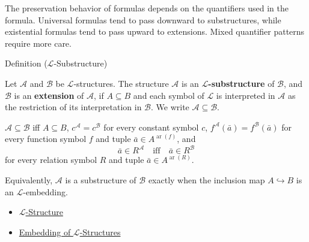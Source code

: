 
\begin{remark*}[Exposition]
The preservation behavior of formulas depends on the quantifiers used in the
formula. Universal formulas tend to pass downward to substructures, while
existential formulas tend to pass upward to extensions. Mixed quantifier
patterns require more care.
\end{remark*}

\begin{definitionbox}{Definition ($\mathcal{L}$-Substructure)}
\begin{definition}\label{def:l-substructure}
Let $\mathcal{A}$ and $\mathcal{B}$ be $\mathcal{L}$-structures.
The structure $\mathcal{A}$ is an \textbf{$\mathcal{L}$-substructure} of
$\mathcal{B}$, and $\mathcal{B}$ is an \textbf{extension} of $\mathcal{A}$, if
$A\subseteq B$ and each symbol of $\mathcal{L}$ is interpreted in
$\mathcal{A}$ as the restriction of its interpretation in $\mathcal{B}$.
We write $\mathcal{A}\subseteq\mathcal{B}$.
\end{definition}
\end{definitionbox}

\begin{remark*}
$\mathcal{A}\subseteq\mathcal{B}$ iff $A\subseteq B$,
$c^{\mathcal{A}}=c^{\mathcal{B}}$ for every constant symbol $c$,
$f^{\mathcal{A}}(\bar a)=f^{\mathcal{B}}(\bar a)$ for every function symbol
$f$ and tuple $\bar a\in A^{\operatorname{ar}(f)}$, and
\[
  \bar a\in R^{\mathcal{A}}
  \quad\text{iff}\quad
  \bar a\in R^{\mathcal{B}}
\]
for every relation symbol $R$ and tuple
$\bar a\in A^{\operatorname{ar}(R)}$.
\end{remark*}

\begin{remark*}[Interpretation]
Equivalently, $\mathcal{A}$ is a substructure of $\mathcal{B}$ exactly when
the inclusion map $A\hookrightarrow B$ is an $\mathcal{L}$-embedding.
\end{remark*}

\begin{dependencies}
\begin{itemize}
  \item \hyperref[def:l-structure]{$\mathcal{L}$-Structure}
  \item \hyperref[def:l-structure-embedding]{Embedding of $\mathcal{L}$-Structures}
\end{itemize}
\end{dependencies}

